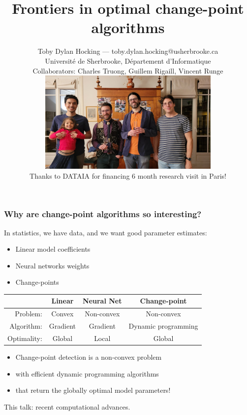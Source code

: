 \documentclass{beamer}
\begin{document}
\title{
  Frontiers in optimal change-point algorithms
}

\author{
  Toby Dylan Hocking --- toby.dylan.hocking@usherbrooke.ca\\ 
  Université de Sherbrooke, Département d'Informatique\\
  Collaborators: Charles Truong, Guillem Rigaill, Vincent Runge\\
  \includegraphics[height=5cm]{2025-01-photo-charles-toby-guillem-vincent.jpg}\\
  Thanks to DATAIA for financing 6 month research visit in Paris!
}

\date{}

\maketitle

\begin{frame}
  \frametitle{Why are change-point algorithms so interesting?}

  In statistics, we have data, and we want good parameter estimates:
  \begin{itemize}
  \item Linear model coefficients
  \item Neural networks weights
  \item Change-points
  \end{itemize}

  \begin{tabular}{rccc}
    \hline
    & Linear & Neural Net & Change-point \\
    \hline 
    Problem:  & Convex & Non-convex & Non-convex \\
    Algorithm: & Gradient & Gradient & Dynamic programming \\
    Optimality: & Global & Local & Global \\
    \hline
  \end{tabular}

  \begin{itemize}
  \item Change-point detection is a non-convex problem
  \item with efficient dynamic programming algorithms
  \item that return the globally optimal model parameters!
  \end{itemize}

  This talk: recent computational advances.
\end{frame}
\end{document}

